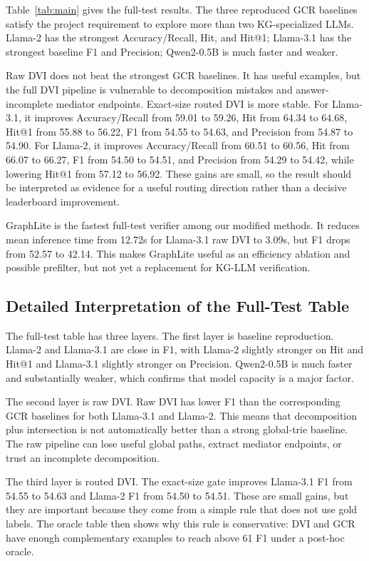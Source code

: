 \documentclass[10pt,twocolumn]{article}
\begin{document}
Table~\ref{tab:main} gives the full-test results. The three reproduced GCR baselines satisfy the project requirement to explore more than two KG-specialized LLMs. Llama-2 has the strongest Accuracy/Recall, Hit, and Hit@1; Llama-3.1 has the strongest baseline F1 and Precision; Qwen2-0.5B is much faster and weaker.

Raw DVI does not beat the strongest GCR baselines. It has useful examples, but the full DVI pipeline is vulnerable to decomposition mistakes and answer-incomplete mediator endpoints. Exact-size routed DVI is more stable. For Llama-3.1, it improves Accuracy/Recall from 59.01 to 59.26, Hit from 64.34 to 64.68, Hit@1 from 55.88 to 56.22, F1 from 54.55 to 54.63, and Precision from 54.87 to 54.90. For Llama-2, it improves Accuracy/Recall from 60.51 to 60.56, Hit from 66.07 to 66.27, F1 from 54.50 to 54.51, and Precision from 54.29 to 54.42, while lowering Hit@1 from 57.12 to 56.92. These gains are small, so the result should be interpreted as evidence for a useful routing direction rather than a decisive leaderboard improvement.

GraphLite is the fastest full-test verifier among our modified methods. It reduces mean inference time from 12.72s for Llama-3.1 raw DVI to 3.09s, but F1 drops from 52.57 to 42.14. This makes GraphLite useful as an efficiency ablation and possible prefilter, but not yet a replacement for KG-LLM verification.


\subsection{Detailed Interpretation of the Full-Test Table}
The full-test table has three layers. The first layer is baseline reproduction. Llama-2 and Llama-3.1 are close in F1, with Llama-2 slightly stronger on Hit and Hit@1 and Llama-3.1 slightly stronger on Precision. Qwen2-0.5B is much faster and substantially weaker, which confirms that model capacity is a major factor.

The second layer is raw DVI. Raw DVI has lower F1 than the corresponding GCR baselines for both Llama-3.1 and Llama-2. This means that decomposition plus intersection is not automatically better than a strong global-trie baseline. The raw pipeline can lose useful global paths, extract mediator endpoints, or trust an incomplete decomposition.

The third layer is routed DVI. The exact-size gate improves Llama-3.1 F1 from 54.55 to 54.63 and Llama-2 F1 from 54.50 to 54.51. These are small gains, but they are important because they come from a simple rule that does not use gold labels. The oracle table then shows why this rule is conservative: DVI and GCR have enough complementary examples to reach above 61 F1 under a post-hoc oracle.
\end{document}

